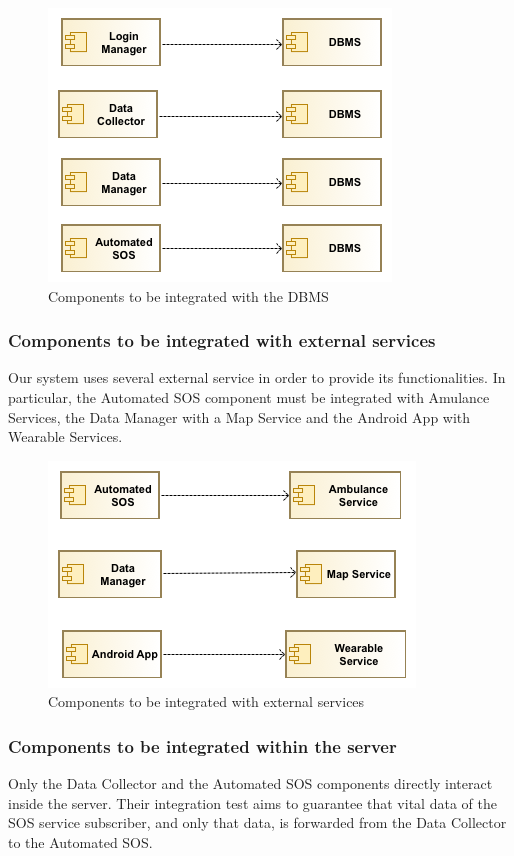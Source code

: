 \begin{figure}[H]
\centering
\includegraphics[scale=0.7]{resources/uml/integration/dbms}
\caption{Components to be integrated with the DBMS}
\end{figure}


\subsubsection{Components to be integrated with external services}
Our system uses several external service in order to provide its functionalities.
In particular, the Automated SOS component must be integrated with Amulance Services, the Data Manager with a Map Service and the Android App with Wearable Services.

\begin{figure}[H]
\centering
\includegraphics[scale=0.7]{resources/uml/integration/external}
\caption{Components to be integrated with external services}
\end{figure}



\subsubsection{Components to be integrated within the server}
Only the Data Collector and the Automated SOS components directly interact inside the server.
Their integration test aims to guarantee that vital data of the SOS service subscriber, and only that data, is forwarded from the Data Collector to the Automated SOS.

